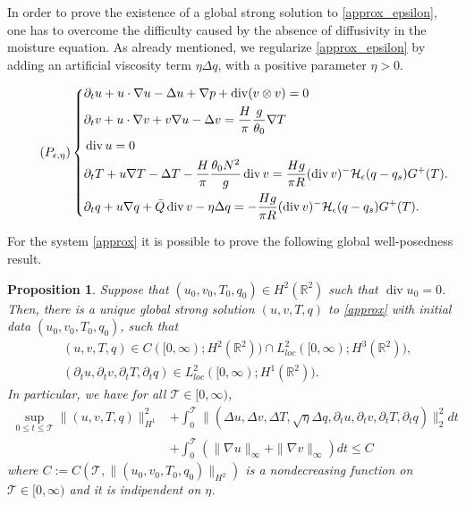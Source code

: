 \documentclass[11pt, a4paper, article,reqno,]{amsart}
\newtheorem{proposition}[theorem]{Proposition}
\theoremstyle{remark}
\DeclareMathOperator{\dive}{div}
\numberwithin{equation}{section}
\begin{document}
In order to prove the existence of a global strong solution to \eqref{approx_epsilon}, one has to overcome the difficulty caused by the absence of diffusivity in the moisture equation. As already mentioned, we regularize \eqref{approx_epsilon} by adding an artificial viscosity term $\eta \Delta q$, with a positive parameter $\eta > 0$.

\begin{equation}\label{approx}\tag{$P_{\epsilon,\eta}$}
\left\{\begin{aligned}
&\partial_t u + u \cdot \nabla u - \Delta u + \nabla p + \dive (v \otimes v) = 0\\
& \partial_ t v + u \cdot \nabla v + v \nabla u - \Delta v = \frac{H}{\pi} \frac{g}{\theta_0} \nabla T \\
& \dive u = 0 \\
& \partial_t T + u \nabla T - \Delta T - \frac{H}{\pi}\frac{\theta_0 N^2}{g}  \dive v = \frac{H g}{\pi R}(\dive v)^- \mathcal{H}_\epsilon(q-q_s) G^+(T). \\
& \partial_t q + u \nabla q + \bar{Q} \dive v - \eta \Delta q = -  \frac{H g}{\pi R}(\dive v)^- \mathcal{H}_\epsilon(q-q_s) G^+(T). 
    \end{aligned}\right.
\end{equation}


For the system \eqref{approx} it is possible to prove the following global well-posedness result.
\begin{proposition}\label{global_existence_fixed_eta}
Suppose that $(u_0,v_0,T_{0},q_0) \in H^2(\mathbb{R}^2)$ such that $\dive u_0=0$. Then, there is a unique global strong solution $(u,v,T,q)$ to \eqref{approx} with initial data $(u_0,v_0,T_{0},q_0)$, such that
    \begin{equation*}
        \begin{aligned}
            & (u,v, T, q) \in C([0, \infty); H^2(\mathbb{R}^2))\cap L^2_{loc}([0, \infty); H^3(\mathbb{R}^2)), \\
            &(\partial_t u,  \partial_t v, \partial_t T, \partial_t q) \in L^2_{loc}([0, \infty); H^1(\mathbb{R}^2)).
        \end{aligned}
    \end{equation*}
In particular, we have for all $\mathcal{T} \in [0,\infty)$,
    \begin{equation}\label{uni_eta_energy}
    \begin{aligned}
        \sup_{0 \leq t \leq \mathcal{T}}\|(u,v,T, q)\|_{H^1}^2 & + \int_0^\mathcal{T} \|(\Delta u, \Delta v, \Delta T, \sqrt{\eta}\Delta q,  \partial_t u, \partial_t v, \partial_t T, \partial_t q)\|_2^2 dt \\
        & + \int_0^\mathcal{T}(\|\nabla u\|_{\infty} + \|\nabla v\|_\infty)dt \leq C
    \end{aligned}
    \end{equation}
    where $C:=C(\mathcal{T}, \|(u_0,v_0,T_{0},q_0)\|_{H^2}) $ is a nondecreasing function on $\mathcal{T} \in [0,\infty)$ and it is indipendent on $\eta$.
    
\end{proposition}
\end{document}
